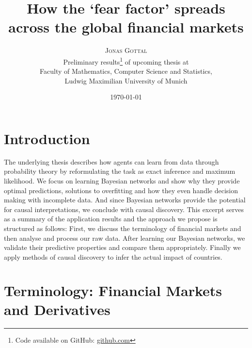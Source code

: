 \documentclass[twoside,twocolumn]{article}
\title{How the `fear factor' spreads across the global financial markets} %
\author{%
\textsc{Jonas Gottal}\\[1ex] %
\normalsize Preliminary results\thanks{Code available on GitHub:  \url{github.com}} of upcoming thesis at \\\normalsize Faculty of Mathematics, Computer Science and Statistics, \\\normalsize  Ludwig Maximilian University of Munich%
}
\date{\today} %
\begin{document}
\maketitle

\section{Introduction}
The underlying thesis describes how agents can learn from data through probability theory by reformulating the task as exact inference and maximum likelihood. We focus on learning Bayesian networks and show why they provide optimal predictions, solutions to overfitting and how they even handle decision making with incomplete data. And since Bayesian networks provide the potential for causal interpretations, we conclude with causal discovery.  
This excerpt serves as a summary of the application results and the approach we propose is structured as follows: First, we discuss the terminology of financial markets and then analyse and process our raw data. After learning our Bayesian networks, we validate their predictive properties and compare them appropriately. Finally we apply methods of causal discovery to infer the actual impact of countries.

\section{Terminology: Financial Markets and Derivatives}
\end{document}
